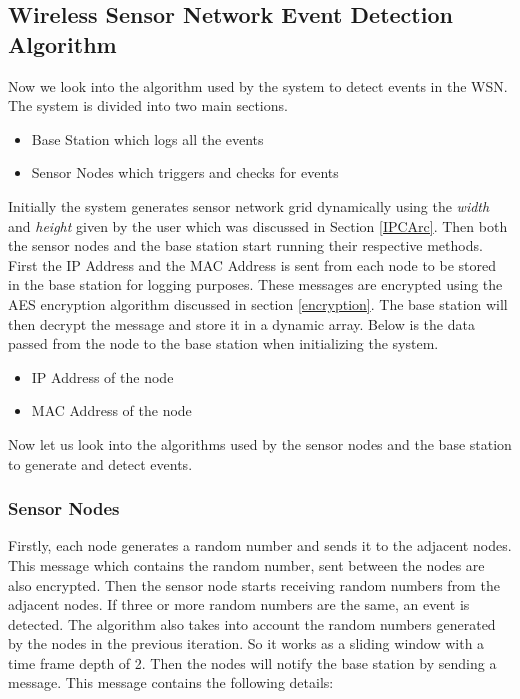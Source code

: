 \documentclass[conference]{IEEEtran}
\begin{document}
	
	\subsection{ Wireless Sensor Network Event Detection Algorithm }
	
	
	Now we look into the algorithm used by the system to detect events in the WSN. The system is divided into two main sections.
	
	\begin{itemize}
		\item Base Station which logs all the events
		\item Sensor Nodes which triggers and checks for events
	\end{itemize}

	Initially the system generates sensor network grid dynamically using the \emph{width} and \emph{height} given by the user which was discussed in Section \ref{IPCArc}. Then both the sensor nodes and the base station start running their respective methods. First the IP Address and the MAC Address is sent from each node to be stored in the base station for logging purposes. These messages are encrypted using the AES encryption algorithm discussed in section \ref{encryption}. The base station will then decrypt the message and store it in a dynamic array. Below is the data passed from the node to the base station when initializing the system.
	
		\begin{itemize}
		\item IP Address of the node
		\item MAC Address of the node
	\end{itemize}
	
	Now let us look into the algorithms used by the sensor nodes and the base station to generate and detect events.
	
	\subsubsection{Sensor Nodes}
	
	Firstly, each node generates a random number and sends it to the adjacent nodes. This message which contains the random number, sent between the nodes are also encrypted. Then the sensor node starts receiving random numbers from the adjacent nodes. If three or more random numbers are the same, an event is detected. The algorithm also takes into account the random numbers generated by the nodes in the previous iteration. So it works as a sliding window with a time frame depth of 2. Then the nodes will notify the base station by sending a message. This message contains the following details:
	
\end{document}
